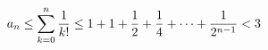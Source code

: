 \documentclass[preview]{standalone}
\begin{document}
\begin{align*}
\special{dvisvgm:raw <g id='unique000'>}a_n\le\sum_{k=0}^{n}\dfrac{1}{k!}\le 1+1+\dfrac{1}{2}+\dfrac{1}{4}+\cdots+\dfrac{1}{2^{n-1}}<3\special{dvisvgm:raw </g>}
\end{align*}
\end{document}
